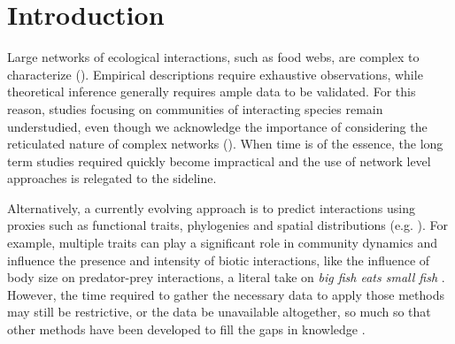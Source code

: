 \documentclass[letterpaper]{article}
\begin{document}
\section{Introduction}
Large networks of ecological interactions, such as food webs, are complex to characterize (\cite{Martinez1992, Pascual2006}). Empirical descriptions require exhaustive observations, while theoretical inference generally requires ample data to be validated. For this reason, studies focusing on communities of interacting species remain understudied, even though we acknowledge the importance of considering the reticulated nature of complex networks (\cite{Ings2009, Tylianakis2008}). When time is of the essence, the long term studies required quickly become impractical and the use of network level approaches is relegated to the sideline.



Alternatively, a currently evolving approach is to predict interactions using proxies such as functional traits, phylogenies and spatial distributions (e.g. \cite{Gravel2013, Morales-Castilla2015, Bartomeus2016}). For example, multiple traits can play a significant role in community dynamics and influence the presence and intensity of biotic interactions, like the influence of body size on predator-prey interactions, a literal take on \emph{big fish eats small fish} \citep{Cohen2003, Brose2006, Gravel2013}. However, the time required to gather the necessary data to apply those methods may still be restrictive, or the data be unavailable altogether, so much so that other methods have been developed to fill the gaps in knowledge \citep[e.g.][]{Schrodt2015}.
\end{document}
